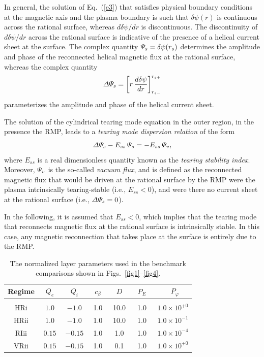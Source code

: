 \documentclass[12pt,prb,aps]{revtex4-1}
\providecommand{\DIFadd}[1]{{\protect\color{blue}\uwave{#1}}} %
\providecommand{\DIFaddbegin}{} %
\providecommand{\DIFaddend}{} %
\begin{document}
In general, the solution of Eq.~(\ref{e3}) that satisfies physical
boundary conditions at the magnetic axis and the plasma boundary is such that $\delta\psi(r)$ is continuous
across the rational surface, whereas $d\delta\psi/dr$ is discontinuous. The discontinuity of
 $d\delta\psi/dr$ across the rational surface is indicative of the presence of a helical current
 sheet at the surface.  The complex quantity ${\mit\Psi}_s= \delta\psi(r_s)$ determines the amplitude
 and phase of the reconnected helical magnetic flux at the rational surface, whereas the complex quantity 
 \begin{equation}
{\mit\Delta\Psi}_{\!s} = \left[r\,\frac{d\delta\psi}{dr}\right]_{r_{s-}}^{r_{s+}}
\end{equation}
parameterizes the amplitude and phase of the helical current sheet.\cite{rf1993}

The solution of
the cylindrical tearing mode equation in the outer region, in the presence \DIFaddbegin \DIFadd{of }\DIFaddend  the RMP,  leads to a {\em tearing mode dispersion relation}\/ of the form\,\cite{rf1993,fkr}
\begin{equation}\label{e110}
{\mit\Delta\Psi}_{\!s}- E_{ss}\,{\mit\Psi}_s = -E_{ss}\,{\mit\Psi}_v,
\end{equation}
where $E_{ss}$ is a real dimensionless quantity known as the {\em tearing stability index}.\cite{fkr} Moreover,
${\mit\Psi}_v$ is the so-called {\em vacuum flux}, and is defined as the reconnected magnetic flux
that would be driven at the rational surface by the RMP were the
plasma intrinsically tearing-stable (i.e., $E_{ss} <0$), and were there no current sheet at the rational surface
(i.e., ${\mit\Delta\Psi}_{\!s}=0$).\cite{rf1993} 

In the following, it is assumed that $E_{ss}<0$, which implies that the tearing mode that
reconnects magnetic flux at the rational surface is intrinsically stable. In this case, any magnetic reconnection that takes place at the
surface is entirely due to the RMP. 

\begin{table}[t]
\centering
\begin{tabular}{ccccccc}
\hline
Regime & ~$Q_e$~ & ~$Q_i$~ & ~$c_\beta$~ & ~$D$~ & ~$P_E$~ & ~$P_\varphi$\\[0.5ex]\hline
&&&&&&\\[-4ex]
HRi  & $1.0$  & $-1.0$  &1.0  &10.0 & 1.0 & $1.0\times 10^{+0}$\\[0.5ex]
HRii & $1.0$  & $-1.0$  & 1.0 & 10.0& 1.0 & $1.0\times 10^{-1}$\\[0.5ex]
RIii   & $0.15$ & $-0.15$ &1.0 & 1.0 & 1.0 & $1.0\times 10^{-4}$\\[0.5ex]
VRii & $0.15$ & $-0.15$ &1.0 & 0.1& 1.0 & $1.0\times 10^{+0}$
\end{tabular}
\caption{The normalized layer parameters used in the benchmark comparisons shown in Figs.~\ref{fig1}--\ref{fig4}. }\label{t1}
\end{table}
\end{document}
